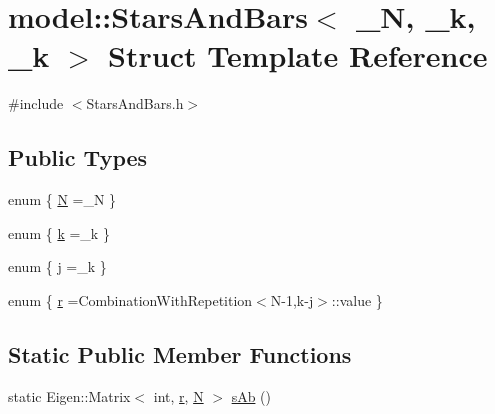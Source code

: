 \hypertarget{structmodel_1_1_stars_and_bars_3_01___n_00_01__k_00_01__k_01_4}{}\section{model\+:\+:Stars\+And\+Bars$<$ \+\_\+\+N, \+\_\+k, \+\_\+k $>$ Struct Template Reference}
\label{structmodel_1_1_stars_and_bars_3_01___n_00_01__k_00_01__k_01_4}


{\ttfamily \#include $<$Stars\+And\+Bars.\+h$>$}

\subsection*{Public Types}
\begin{DoxyCompactItemize}
\item 
enum \{ \hyperlink{structmodel_1_1_stars_and_bars_3_01___n_00_01__k_00_01__k_01_4_a95370415be1c781636b90612c0bd36bea91efe095c67b8627d6c68f26d4273404}{N} =\+\_\+\+N
 \}
\item 
enum \{ \hyperlink{structmodel_1_1_stars_and_bars_3_01___n_00_01__k_00_01__k_01_4_abcf381dda1d568db27f36f172386d8bfada0826f890db89ecacb167dcd99d3eed}{k} =\+\_\+k
 \}
\item 
enum \{ \hyperlink{structmodel_1_1_stars_and_bars_3_01___n_00_01__k_00_01__k_01_4_ac85c2e5b3db0d0e41d5ba44a57563301a9b6604cc45c847ff29da00f56bcfa0f9}{j} =\+\_\+k
 \}
\item 
enum \{ \hyperlink{structmodel_1_1_stars_and_bars_3_01___n_00_01__k_00_01__k_01_4_a6156f6d3a0ef18338f491d8e5644bd13a184684b77fc05bf9283982b5b1b00cc4}{r} =Combination\+With\+Repetition$<$N-\/1,k-\/j$>$\+:\+:value
 \}
\end{DoxyCompactItemize}
\subsection*{Static Public Member Functions}
\begin{DoxyCompactItemize}
\item 
static Eigen\+::\+Matrix$<$ int, \hyperlink{structmodel_1_1_stars_and_bars_3_01___n_00_01__k_00_01__k_01_4_a6156f6d3a0ef18338f491d8e5644bd13a184684b77fc05bf9283982b5b1b00cc4}{r}, \hyperlink{structmodel_1_1_stars_and_bars_3_01___n_00_01__k_00_01__k_01_4_a95370415be1c781636b90612c0bd36bea91efe095c67b8627d6c68f26d4273404}{N} $>$ \hyperlink{structmodel_1_1_stars_and_bars_3_01___n_00_01__k_00_01__k_01_4_a3837ba3ce185cb209d0e8625068b62af}{s\+Ab} ()
\end{DoxyCompactItemize}


